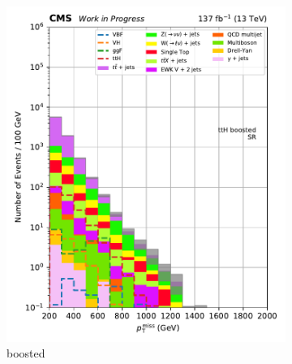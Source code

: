 \begin{figure}[htbp]
    \centering
    \begin{subfigure}[b]{0.24\textwidth}
        \includegraphics[width=\textwidth]{figures/region_plots/full_Run2/region_0/ttH_boosted.pdf}
        \caption{\ttH boosted}
    \end{subfigure}
    \hfill
    \begin{subfigure}[b]{0.24\textwidth}

\end{subfigure}
\end{figure}
